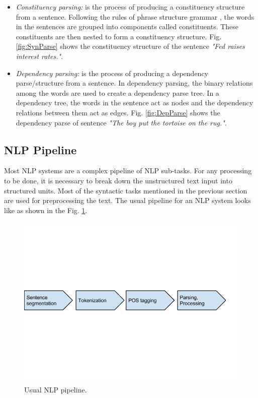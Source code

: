 \begin{itemize}

\item \textit{Constituency parsing:} is the process of producing a constituency structure from a sentence. Following the rules of phrase structure grammar \cite{wiki:phrasegrammar}, the words in the sentences are grouped into components called constituents. These constituents are then nested to form a constituency structure. Fig. \ref{fig:SynParse} shows the constituency structure of the sentence \textit{"Fed raises interest rates."}.

\item \textit{Dependency parsing:} is the process of producing a dependency parse/structure from a sentence. In dependency parsing, the binary relations among the words are used to create a dependency parse tree. In a dependency tree, the words in the sentence act as nodes and the dependency relations between them act as edges. Fig. \ref{fig:DepParse} shows the dependency parse of sentence \textit{"The boy put the tortoise on the rug."}.

\end{itemize}

\subsection{NLP Pipeline}

Most NLP systems are a complex pipeline of NLP sub-tasks. For any processing to be done, it is necessary to break down the unstructured text input into structured units. Most of the syntactic tasks mentioned in the previous section are used for preprocessing the text. The usual pipeline for an NLP system looks like as shown in the Fig. \ref{fig:NLPPipe}.

\begin{figure}
\centering
\includegraphics[scale=0.4]{figures/NLPPipeline.png}
\caption{Usual NLP pipeline.}\label{fig:NLPPipe}
\end{figure}

